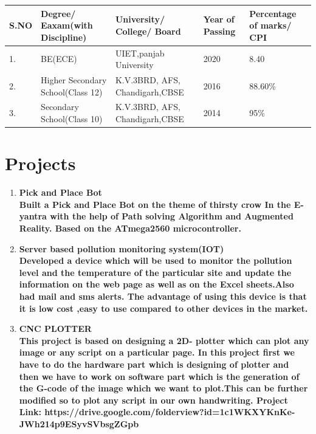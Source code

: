 \documentclass[11pt]{article}
\begin{document}
\begin{vwcol}[widths={0.235,0.6}, sep=1.3cm, justify=flush, rule=0.1pt, indent=0em]
\begin{minipage}{12.73cm}
\begin{tabular}{ |p{1cm}||p{3cm}|p{3cm}|p{2cm}|p{2cm}|  }
 \hline
 S.NO &Degree/ Eaxam(with Discipline)& University/ College/ Board &Year of Passing&Percentage of marks/ CPI\\
 \hline
 1. & BE(ECE) & UIET,panjab University &2020 &8.40\\
 \hline
 2. & Higher Secondary School(Class 12) & K.V.3BRD, AFS, Chandigarh,CBSE &2016 &88.60\%\\
 \hline
 3. & Secondary School(Class 10) & K.V.3BRD, AFS, Chandigarh,CBSE &2014 &95\%\\

 \hline
\end{tabular}

\section{Projects}
\begin{enumerate}[leftmargin=*]
\item \bfseries Pick and Place Bot\\
\mdseries Built a Pick and Place Bot on the theme of thirsty crow In the E-yantra with the help of Path solving Algorithm and Augmented Reality. Based on the ATmega2560 microcontroller.\\

\item \bfseries Server based pollution monitoring system(IOT)\\
\mdseries  Developed a device which will be used to monitor the pollution level and the temperature of the particular site and update the information on the web page as well as on the Excel sheets.Also had mail and sms alerts. The advantage of using this device is that it is low cost ,easy to use compared to other devices in the market.\\

\item \bfseries CNC PLOTTER\\
\mdseries This project is based on designing a 2D- plotter which can plot any image or any script on a particular page. In this project first we have to do the hardware part which is designing of plotter and then we have to work on software part which is the generation of the G-code of the image which we want to plot.This can be further modified so to plot any script in our own handwriting.
Project Link: https://drive.google.com/folderview?id=1c1WKXYKnKe-JWh214p9ESyvSVbsgZGpb
\end{enumerate}
\end{minipage}


\end{vwcol}
\end{document}
